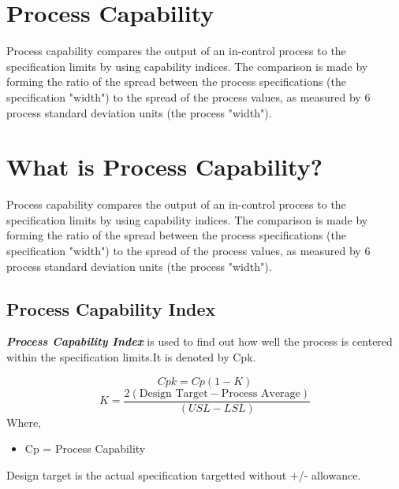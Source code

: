 \documentclass[12pt]{article}
\begin{document}
\tableofcontents
\section{Process Capability}


Process capability compares the output of an in-control process to the specification limits by using capability indices. The comparison is made by forming the ratio of the spread between the process specifications (the specification "width") to the spread of the process values, as measured by 6 process standard deviation units (the process "width").
\section{What is Process Capability?}

Process capability compares the output of an in-control process to the specification limits by using capability indices. The comparison is made by forming the ratio of the spread between the process specifications (the specification "width") to the spread of the process values, as measured by 6 process standard deviation units (the process "width").

\subsection{Process Capability Index}

\textit{\textbf{Process Capability Index}} is used to find out how well the process is centered within the specification limits.It is denoted by Cpk.

\[Cpk = Cp(1-K)\]
\[K = \frac{2(\mbox{Design Target} - \mbox{Process Average})}{ (USL - LSL)}
\]
Where,

\begin{itemize}
\item Cp = Process Capability
\end{itemize}

Design target is the actual specification targetted without +/- allowance.
\end{document}
